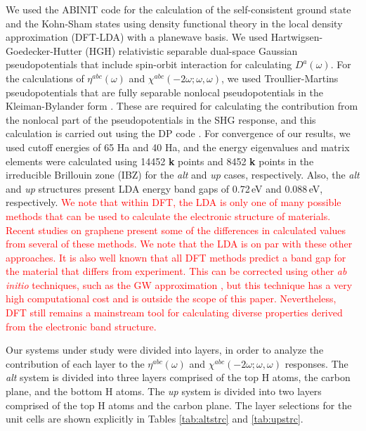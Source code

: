 \documentclass[pss]{wiley2sp} %
\begin{document}
We used the ABINIT code \cite{gonzeCPC09} for the calculation of the 
self-consistent ground state and the Kohn-Sham states using density functional
theory in the local density approximation (DFT-LDA) with a planewave basis. We
used Hartwigsen-Goedecker-Hutter (HGH) relativistic separable dual-space
Gaussian pseudopotentials \cite{hartwigsenPRB98} that include spin-orbit
interaction for calculating $D^{a}(\omega)$. For the calculations of
{$\eta^{abc}(\omega)$} and $\chi^{abc}(-2\omega;\omega,\omega)$, we used
Troullier-Martins pseudopotentials \cite{troullierPRB91} that are fully
separable nonlocal pseudopotentials in the Kleiman-Bylander form
\cite{kleinmanPRL82}. These are required for calculating the contribution from
the nonlocal part of the pseudopotentials in the SHG response, and this
calculation is carried out using the DP code \cite{olevanoDP}. For convergence
of our results, we used  cutoff energies of 65 Ha and 40 Ha, and the energy
eigenvalues and matrix elements were calculated using 14452 \textbf{k} points
and 8452 \textbf{k} points in the irreducible Brillouin zone (IBZ) for the
\emph{alt} and \emph{up} cases, respectively. Also, the \emph{alt} and
\emph{up} structures present LDA energy band gaps of  0.72\,eV and 0.088\,eV,
respectively.
\textcolor{red}{
We note that within DFT, the LDA is only one of many possible methods that can
be used to calculate the electronic structure of materials. Recent studies on
graphene \cite{karamanisJPCC15,botelloACR14} present some of the differences
in calculated values from several of these methods. We note that the LDA is on
par with these other approaches. It is also well known that all DFT methods
predict a band gap for the material that differs from experiment. This can be
corrected using other \emph{ab initio} techniques, such as the GW
approximation \cite{onidaRMP02}, but this technique 
has a very high computational cost
and is outside the scope of this paper. Nevertheless, DFT still
remains a mainstream tool for calculating diverse properties derived from the
electronic band structure. }

Our systems under study were divided into layers, in order to analyze
the contribution of each layer to the $\eta^{abc}(\omega)$ and
$\chi^{abc}(-2\omega;\omega,\omega)$ responses. The
\emph{alt} system is divided into three layers comprised of the top H atoms,
the carbon plane, and the bottom H atoms. The \emph{up} system is divided into
two layers comprised of the top H atoms and the carbon plane. The layer
selections for the unit cells are shown explicitly in Tables \ref{tab:altstrc}
and \ref{tab:upstrc}.
\end{document}
